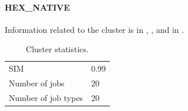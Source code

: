 \documentclass[]{llncs}
\begin{document}
\paragraph{HEX\_NATIVE}
Information related to the cluster is in , , and in .

\begin{table}
  \centering
  \begin{tabular}{ll}
    SIM & 0.99 \\
    Number of jobs & 20 \\
    Number of job types & 20 \\
  \end{tabular}
  \caption{Cluster statistics.}
  \label{tab:use_case:hex_native:stats}
\end{table}
\end{document}
